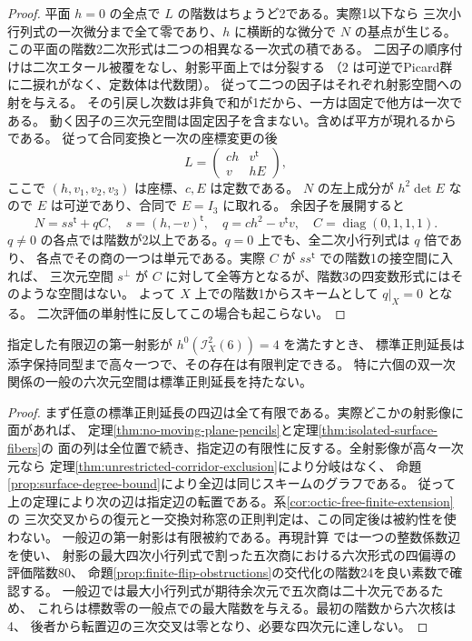 \begin{proof}
平面 $h=0$ の全点で $L$ の階数はちょうど2である。実際1以下なら
三次小行列式の一次微分まで全て零であり、$h$ に横断的な微分で $N$ の基点が生じる。
この平面の階数2二次形式は二つの相異なる一次式の積である。
二因子の順序付けは二次エタール被覆をなし、射影平面上では分裂する
（$2$ は可逆でPicard群に二捩れがなく、定数体は代数閉）。
従って二つの因子はそれぞれ射影空間への射を与える。
その引戻し次数は非負で和が1だから、一方は固定で他方は一次である。
動く因子の三次元空間は固定因子を含まない。含めば平方が現れるからである。
従って合同変換と一次の座標変更の後
\[
            L=\begin{pmatrix} ch & v^{\mathsf t}\\v & hE \end{pmatrix},
\]
ここで $(h,v_1,v_2,v_3)$ は座標、$c,E$ は定数である。
$N$ の左上成分が $h^2\det E$ なので $E$ は可逆であり、合同で $E=I_3$ に取れる。
余因子を展開すると
\[
 N=ss^{\mathsf t}+q C,\quad s=(h,-v)^{\mathsf t},\quad
 q=ch^2-v^{\mathsf t}v,\quad C=\operatorname{diag}(0,1,1,1).
\]
$q\ne0$ の各点では階数が2以上である。$q=0$ 上でも、全二次小行列式は $q$ 倍であり、
各点でその商の一つは単元である。実際 $C$ が $ss^{\mathsf t}$ での階数1の接空間に入れば、
三次元空間 $s^\perp$ が $C$ に対して全等方となるが、階数3の四変数形式にはそのような空間はない。
よって $X$ 上での階数1からスキームとして $q|_X=0$ となる。
二次評価の単射性に反してこの場合も起こらない。
\end{proof}

\begin{corollary}\label{cor:sextic-threshold-finite-extension}
指定した有限辺の第一射影が $h^0(\mathcal I_X^2(6))=4$ を満たすとき、
標準正則延長は添字保持同型まで高々一つで、その存在は有限判定できる。
特に六個の双一次関係の一般の六次元空間は標準正則延長を持たない。
\end{corollary}
\begin{proof}
まず任意の標準正則延長の四辺は全て有限である。実際どこかの射影像に面があれば、
定理\ref{thm:no-moving-plane-pencils}と定理\ref{thm:isolated-surface-fibers}の
面の列は全位置で続き、指定辺の有限性に反する。全射影像が高々一次元なら
定理\ref{thm:unrestricted-corridor-exclusion}により分岐はなく、
命題\ref{prop:surface-degree-bound}により全辺は同じスキームのグラフである。
従って上の定理により次の辺は指定辺の転置である。系\ref{cor:octic-free-finite-extension}の
三次交叉からの復元と一交換対称窓の正則判定は、この同定後は被約性を使わない。
一般辺の第一射影は有限被約である。再現計算
 では一つの整数係数辺を使い、
射影の最大四次小行列式で割った五次商における六次形式の四偏導の評価階数80、
命題\ref{prop:finite-flip-obstructions}の交代化の階数24を良い素数で確認する。
一般辺では最大小行列式が期待余次元で五次商は二十次元であるため、
これらは標数零の一般点での最大階数を与える。最初の階数から六次核は4、
後者から転置辺の三次交叉は零となり、必要な四次元に達しない。
\end{proof}
